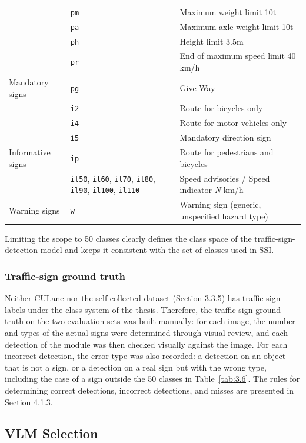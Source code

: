 \documentclass[12pt,a4paper]{report}
\begin{document}
\begin{longtable}{
    >{\RaggedRight\arraybackslash}p{3.2cm}
    >{\RaggedRight\arraybackslash}p{5.0cm}
    >{\RaggedRight\arraybackslash}p{6.3cm}
}
     & \texttt{pm} & Maximum weight limit 10t \\
     & \texttt{pa} & Maximum axle weight limit 10t \\
     & \texttt{ph} & Height limit 3.5m \\
     & \texttt{pr} & End of maximum speed limit 40 km/h \\
    Mandatory signs & \texttt{pg} & Give Way \\
     & \texttt{i2} & Route for bicycles only \\
     & \texttt{i4} & Route for motor vehicles only \\
     & \texttt{i5} & Mandatory direction sign \\
    Informative signs & \texttt{ip} & Route for pedestrians and bicycles \\
     & \texttt{il50}, \texttt{il60}, \texttt{il70}, \texttt{il80}, \texttt{il90}, \texttt{il100}, \texttt{il110} & Speed advisories / Speed indicator \textit{N} km/h \\
    Warning signs & \texttt{w} & Warning sign (generic, unspecified hazard type) \\
\end{longtable}

Limiting the scope to 50 classes clearly defines the class space of the traffic-sign-detection model and keeps it consistent with the set of classes used in SSI.

\subsubsection*{Traffic-sign ground truth}

Neither CULane nor the self-collected dataset (Section 3.3.5) has traffic-sign labels under the class system of the thesis. Therefore, the traffic-sign ground truth on the two evaluation sets was built manually: for each image, the number and types of the actual signs were determined through visual review, and each detection of the module was then checked visually against the image. For each incorrect detection, the error type was also recorded: a detection on an object that is not a sign, or a detection on a real sign but with the wrong type, including the case of a sign outside the 50 classes in Table~\ref{tab:3.6}. The rules for determining correct detections, incorrect detections, and misses are presented in Section 4.1.3.

\subsection{VLM Selection}
\end{document}
